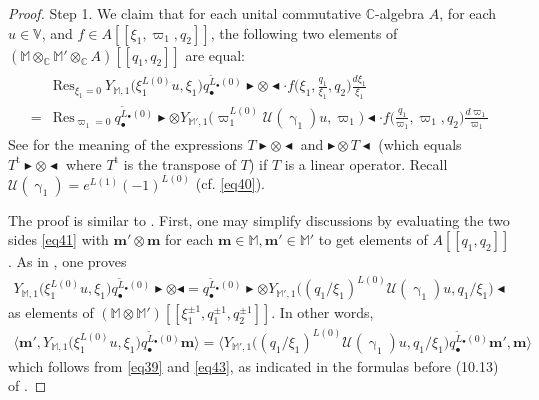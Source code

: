 \documentclass[11pt,b5paper,notitlepage]{article}
\theoremstyle{definition}
\theoremstyle{plain}
\newcommand{\mc}{\mathcal}
\newcommand{\wtd}{\widetilde}
\newcommand{\tr}{\mathrm{t}} %
\newcommand{\Res}{\mathrm{Res}}
\newcommand{\mbf}{\mathbf}
\newcommand{\blt}{\bullet}
\newcommand{\Vbb}{\mathbb V}
\newcommand{\Mbb}{\mathbb M}
\newcommand{\Cbb}{\mathbb C}
\newcommand{\btl}{\blacktriangleleft}
\newcommand{\btr}{\blacktriangleright}
\newcommand{\<}{\left\langle}
\renewcommand{\>}{\right\rangle}
\newcommand{\bigbk}[1]{\big\langle {#1}\big\rangle}
\numberwithin{equation}{subsection}
\begin{document}
\begin{proof}
Step 1. We claim that for each unital commutative $\Cbb$-algebra $A$, for each   $u\in\Vbb$, and $f\in A[[\xi_1,\varpi_1,q_2]]$,  the following two elements of $(\Mbb\otimes_\Cbb\Mbb'\otimes_\Cbb A)[[q_1,q_2]]$ are equal:
\begin{align}\label{eq41}
\begin{aligned}
&\Res_{\xi_1=0}~Y_{\Mbb,1}\big(\xi_1^{L(0)}u,\xi_1\big)q_\blt^{\wtd L_\blt(0)}\btr\otimes \btl\cdot f\big(\xi_1,\frac{q_1}{\xi_1},q_2\big)\frac{d\xi_1}{\xi_1}\\
=&\Res_{\varpi_1=0}~q_\blt^{\wtd L_\blt(0)}\btr\otimes Y_{\Mbb',1}\big(\varpi_1^{L(0)}\mc U(\upgamma_1)u,\varpi_1\big)\btl\cdot f\big(\frac{q_1}{\varpi_1},\varpi_1,q_2\big)\frac{d\varpi_1}{\varpi_1}
\end{aligned}
\end{align}
See \cite[(10.2,10.3)]{Gui-sewingconvergence} for the meaning of the expressions $T\btr\otimes\btl$ and $\btr\otimes T\btl$ (which equals $T^\tr\btr\otimes\btl$ where $T^\tr$ is the transpose of $T$) if $T$ is a linear operator. Recall $\mc U(\upgamma_1)=e^{L(1)}(-1)^{L(0)}$ (cf. \eqref{eq40}).

The proof is similar to \cite[Lem. 10.2]{Gui-sewingconvergence}. First, one may simplify discussions by evaluating the two sides \eqref{eq41} with $\mbf m'\otimes\mbf m$ for each $\mbf m\in\Mbb,\mbf m'\in\Mbb'$ to get elements of $A[[q_1,q_2]]$. As in \cite[(10.13)]{Gui-sewingconvergence}, one proves
\begin{align}
Y_{\Mbb,1}\big(\xi_1^{L(0)}u,\xi_1\big)q_\blt^{\wtd L_\blt(0)}\btr\otimes \btl=q_\blt^{\wtd L_\blt(0)}\btr\otimes Y_{\Mbb',1}\big((q_1/\xi_1)^{L(0)}\mc U(\upgamma_1)u,q_1/\xi_1\big)\btl  \label{eq42}
\end{align}
as elements of $(\Mbb\otimes\Mbb')[[\xi_1^{\pm1},q_1^{\pm1},q_2^{\pm1}]]$. In other words,
\begin{align}
\bigbk{\mbf m',Y_{\Mbb,1}\big(\xi_1^{L(0)}u,\xi_1\big)q_\blt^{\wtd L_\blt(0)}\mbf m}=\bigbk{Y_{\Mbb',1}\big((q_1/\xi_1)^{L(0)}\mc U(\upgamma_1)u,q_1/\xi_1\big)q_\blt^{\wtd L_\blt(0)}\mbf m', \mbf m}
\end{align}
which follows from \eqref{eq39} and \eqref{eq43}, as indicated in the formulas before (10.13) of \cite{Gui-sewingconvergence}.


\end{proof}
\end{document}

